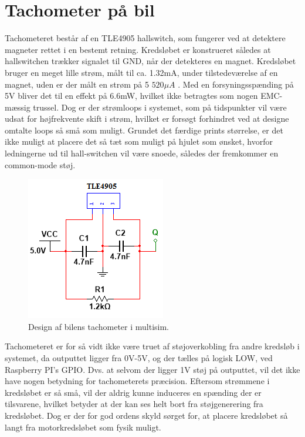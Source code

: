 \section{Tachometer på bil}

Tachometeret består af en TLE4905 \cite{lib:tle4905}
hallswitch, som fungerer ved at detektere magneter rettet i en bestemt retning. Kredsløbet er konstrueret således at hallswitchen trækker signalet til GND, når der detekteres en magnet. Kredsløbet bruger en meget lille strøm, målt til ca. 1.32mA, under tilstedeværelse af en magnet, uden er der målt en strøm på 5 $520\mu A$ . Med en forsyningsspænding på 5V bliver det til en effekt på 6.6mW, hvilket ikke betragtes som nogen EMC-mæssig trussel. Dog er der strømloops i systemet, som på tidspunkter vil være udsat for højfrekvente skift i strøm, hvilket er forsøgt forhindret ved at designe omtalte loops så små som muligt. Grundet det færdige prints størrelse, er det ikke muligt at placere det så tæt som muligt på hjulet som ønsket, hvorfor ledningerne ud til hall-switchen vil være snoede, således der fremkommer en common-mode støj.

\begin{figure}[h]
\centering
\includegraphics[scale=1]{../fig/billeder/tachometer_multisim.png}
\caption{Design af bilens tachometer i multisim.}
\label{fig:tachometer_multisim}
\end{figure}

Tachometeret er for så vidt ikke være truet af støjoverkobling fra andre kredsløb i systemet, da outputtet ligger fra 0V-5V, og der tælles på logisk LOW, ved Raspberry PI's GPIO. Dvs. at selvom der ligger 1V støj på outputtet, vil det ikke have nogen betydning for tachometerets præcision. Eftersom strømmene i kredsløbet er så små, vil der aldrig kunne induceres en spænding der er tilsvarene, hvilket betyder at der kan ses helt bort fra støjgenerering fra kredsløbet.  Dog er der for god ordens skyld sørget for, at placere kredsløbet så langt fra motorkredsløbet som fysik muligt. 

\clearpage
